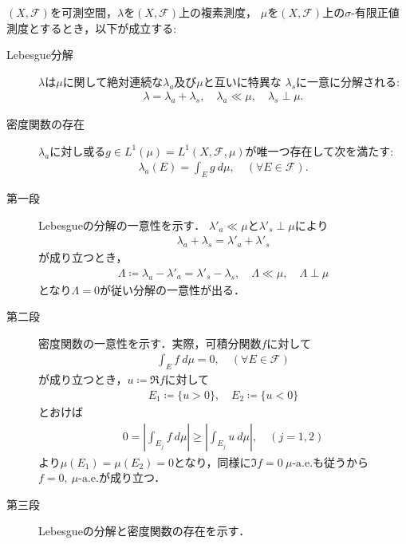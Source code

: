 	\begin{screen}
		\begin{thm}
			$(X,\mathscr{F})$を可測空間，$\lambda$を$(X,\mathscr{F})$上の複素測度，
			$\mu$を$(X,\mathscr{F})$上の$\sigma$-有限正値測度とするとき，以下が成立する:
			\begin{description}
				\item[Lebesgue分解]
					$\lambda$は$\mu$に関して絶対連続な$\lambda_a$及び$\mu$と互いに特異な
					$\lambda_s$に一意に分解される:
					\begin{align}
						\lambda = \lambda_a + \lambda_s,
						\quad \lambda_a \ll \mu,
						\quad \lambda_s \perp \mu.
					\end{align}
				
				\item[密度関数の存在]
					$\lambda_a$に対し或る$g \in L^1(\mu) = L^1(X,\mathscr{F},\mu)$が唯一つ存在して次を満たす:
					\begin{align}
						\lambda_a(E) = \int_E g\ d\mu,
						\quad (\forall E \in \mathscr{F}).
					\end{align}
			\end{description}
		\end{thm}
	\end{screen}
	
	\begin{prf}\mbox{}
		\begin{description}
			\item[第一段] Lebesgueの分解の一意性を示す．
				$\lambda'_a \ll \mu$と$\lambda'_s \perp \mu$により
				\begin{align}
					\lambda_a + \lambda_s = \lambda'_a + \lambda'_s
				\end{align}
				が成り立つとき，
				\begin{align}
					\Lambda \coloneqq \lambda_a - \lambda'_a = \lambda'_s - \lambda_s,
					\quad \Lambda \ll \mu,
					\quad \Lambda \perp \mu
				\end{align}
				となり$\Lambda = 0$が従い分解の一意性が出る．
			
			\item[第二段] 密度関数の一意性を示す．実際，可積分関数$f$に対して
				\begin{align}
					\int_E f\ d\mu = 0, \quad (\forall E \in \mathscr{F})
				\end{align}
				が成り立つとき，$u \coloneqq \Re{f}$に対して
				\begin{align}
					E_1 \coloneqq \{u > 0\},
					\quad E_2 \coloneqq \{u < 0\}
				\end{align}
				とおけば
				\begin{align}
					0 = \left| \int_{E_j} f\ d\mu \right| \geq \left| \int_{E_j} u\ d\mu \right|,
					\quad (j=1,2)
				\end{align}
				より$\mu(E_1) = \mu(E_2) = 0$となり，同様に$\Im{f} = 0\ \mbox{$\mu$-a.e.}$も従うから
				$f = 0,\ \mbox{$\mu$-a.e.}$が成り立つ．
				
			\item[第三段] Lebesgueの分解と密度関数の存在を示す．
				
		\end{description}
	\end{prf}
	
